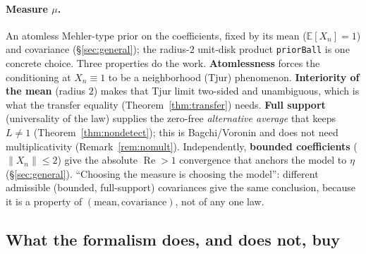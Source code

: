 \documentclass[11pt,a4paper]{article}
\theoremstyle{definition}
\newcommand{\Rea}{\operatorname{Re}}
\begin{document}
\paragraph{Measure \(\mu\).} An atomless Mehler-type prior on the coefficients, fixed by its
mean (\(\mathbb{E}[X_n]=1\)) and covariance (\S\ref{sec:general}); the radius-\(2\)
unit-disk product \texttt{priorBall} is one concrete choice. Three properties do the work.
\textbf{Atomlessness} forces the conditioning at \(X_n\equiv1\) to be a neighborhood (Tjur)
phenomenon. \textbf{Interiority of the mean} (radius \(2\)) makes that Tjur limit two-sided
and unambiguous, which is what the transfer equality (Theorem~\ref{thm:transfer}) needs.
\textbf{Full support} (universality of the law) supplies the zero-free \emph{alternative
average} that keeps \(L\neq1\) (Theorem~\ref{thm:nondetect}); this is Bagchi/Voronin and does
not need multiplicativity (Remark~\ref{rem:nomult}). Independently, \textbf{bounded
coefficients} (\(\|X_n\|\le2\)) give the absolute \(\Rea>1\)
convergence that anchors the model to \(\eta\) (\S\ref{sec:general}). ``Choosing the measure is choosing the model'':
different admissible (bounded, full-support) covariances give the same conclusion, because it
is a property of \((\text{mean},\text{covariance})\), not of any one law.

\subsection{What the formalism does, and does not, buy}\label{sec:fences}
\end{document}
